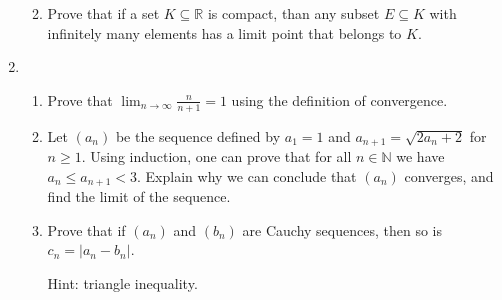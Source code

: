\documentclass[12pt]{article}
\newcommand{\points}[1]{\marginpar{\hspace{24pt}[#1]}}
\newcommand{\di}{\displaystyle}
\newcommand{\R}{\mathbb{R}}
\newcommand{\N}{\mathbb{N}}
\newcommand{\abs}[1]{\lvert #1\rvert}
\begin{document}
\begin{enumerate}
\begin{enumerate}
\vspace{2.5in}

      \item Prove that if a set $K\subseteq \R$ is compact, than any subset $E\subseteq K$ with infinitely many elements has a limit point that belongs to $K$. \points{7}
      \end{enumerate}
\newpage

\item \begin{enumerate}
       \item Prove that $\di \lim_{n\to\infty}\frac{n}{n+1} = 1$ using the definition of convergence. \points{4}

\newpage

      \item Let $(a_n)$ be the sequence defined by $a_1=1$ and $a_{n+1} = \sqrt{2a_n+2}$ for $n\geq 1$. Using induction, one can prove that for all $n\in\N$ we have $a_n\leq a_{n+1} <3$. Explain why we can conclude that $(a_n)$ converges, and find the limit of the sequence. \points{3}

\vspace{4in}

      \item Prove that if $(a_n)$ and $(b_n)$ are Cauchy sequences, then so is $c_n=\abs{a_n-b_n}$. \points{3}

Hint: triangle inequality.
      \end{enumerate}



\end{enumerate}
\end{document}
